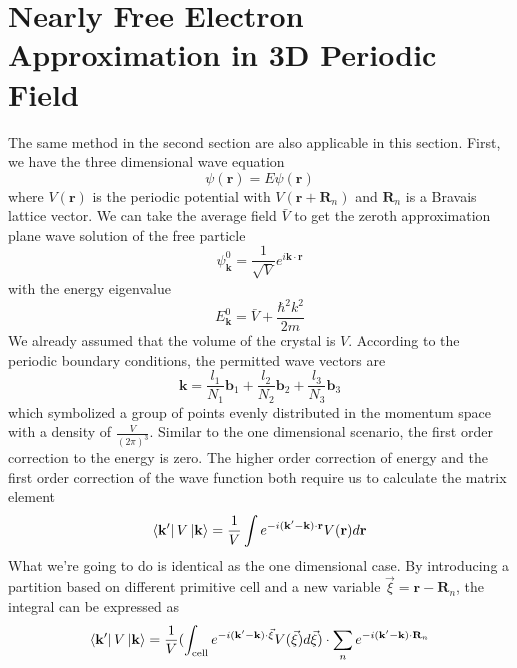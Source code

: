 \documentclass{article}
\begin{document}
\section{Nearly Free Electron Approximation in 3D Periodic Field}
The same method in the second section are also applicable in this section. First, we have the three dimensional wave equation\begin{equation}
    [-\frac{\hbar^2}{2m}\nabla^2+V(\mathbf{r})]\psi(\mathbf{r})=E\psi(\mathbf{r})
\end{equation}
where $V(\mathbf{r})$ is the periodic potential with $V(\mathbf{r}+\mathbf{R}_n)$ and $\mathbf{R}_n$ is a Bravais lattice vector. We can take the average field $\bar{V}$ to get the zeroth approximation plane wave solution of the free particle\begin{equation}
    \psi_{\mathbf{k}}^0=\frac{1}{\sqrt{V}}e^{i\mathbf{k}\cdot\mathbf{r}}
\end{equation}
with the energy eigenvalue\begin{equation}
    E_{\mathbf{k}}^0=\bar{V}+\frac{\hbar^2k^2}{2m}
\end{equation}
We already assumed that the volume of the crystal is $V$. According to the periodic boundary conditions, the permitted wave vectors are\begin{equation}
    \mathbf{k}=\frac{l_1}{N_1}\mathbf{b}_1+\frac{l_2}{N_2}\mathbf{b}_2+\frac{l_3}{N_3}\mathbf{b}_3
\end{equation}
which symbolized a group of points evenly distributed in the momentum space with a density of $\frac{V}{(2\pi)^3}$. Similar to the one dimensional scenario, the first order correction to the energy is zero. The higher order correction of energy and the first order correction of the wave function both require us to calculate the matrix element\begin{equation}
    \bra{\mathbf{k}'}V\ket{\mathbf{k}}=\frac{1}{V}\int{e^{-i(\mathbf{k}'-\mathbf{k})\cdot\mathbf{r}}V(\mathbf{r})}d\mathbf{r}
\end{equation}
What we're going to do is identical as the one dimensional case. By introducing a partition based on different primitive cell and a new variable $\vec{\xi}=\mathbf{r}-\mathbf{R}_n$, the integral can be expressed as\begin{equation}
    \bra{\mathbf{k}'}V\ket{\mathbf{k}}=\frac{1}{V}(\int_{\mathrm{cell}}e^{-i(\mathbf{k}'-\mathbf{k})\cdot\vec\xi}V(\vec\xi)d\vec\xi)\cdot\sum_n{e^{-i(\mathbf{k}'-\mathbf{k})\cdot\mathbf{R}_n}}
\end{equation}
\end{document}
